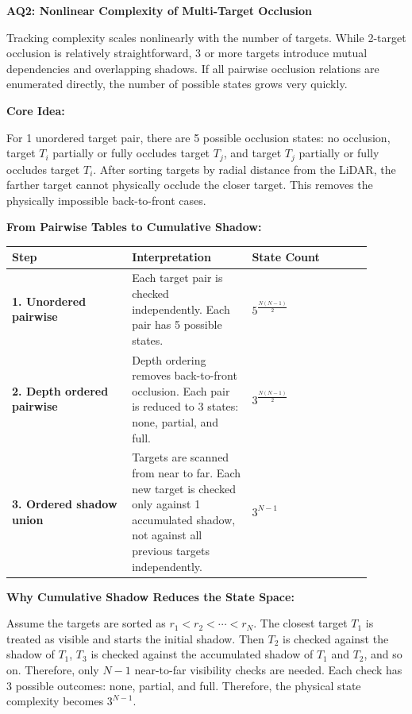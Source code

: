 \documentclass[11pt,a4paper]{report}
\newcommand{\boxitemtitle}[1]{
    \vspace{0.5em}
    {\large\textbf{\color{DeepBlue} #1}}\par
    \vspace{0.8em}
}
\begin{document}
\newpage
\boxitemtitle{AQ2: Nonlinear Complexity of Multi-Target Occlusion}
\begin{contentbox}
Tracking complexity scales nonlinearly with the number of targets. While 2-target occlusion is relatively straightforward, 3 or more targets introduce mutual dependencies and overlapping shadows. If all pairwise occlusion relations are enumerated directly, the number of possible states grows very quickly.

\vspace{0.6em}
\textbf{Core Idea:}

For 1 unordered target pair, there are 5 possible occlusion states: no occlusion, target $T_i$ partially or fully occludes target $T_j$, and target $T_j$ partially or fully occludes target $T_i$. After sorting targets by radial distance from the LiDAR, the farther target cannot physically occlude the closer target. This removes the physically impossible back-to-front cases.

\vspace{0.8em}
\textbf{From Pairwise Tables to Cumulative Shadow:}

\begin{center}
\small
\begin{tabular}{p{0.30\linewidth} p{0.30\linewidth} p{0.30\linewidth}}
\hline
\textbf{Step} & \textbf{Interpretation} & \textbf{State Count} \\
\hline
\textbf{1. Unordered pairwise} &
Each target pair is checked independently. Each pair has 5 possible states. &
$5^{\frac{N(N-1)}{2}}$
\\
\textbf{2. Depth ordered pairwise} &
Depth ordering removes back-to-front occlusion. Each pair is reduced to 3 states: none, partial, and full. &
$3^{\frac{N(N-1)}{2}}$
\\
\textbf{3. Ordered shadow union} &
Targets are scanned from near to far. Each new target is checked only against 1 accumulated shadow, not against all previous targets independently. &
$3^{N-1}$
\\
\hline
\end{tabular}
\end{center}

\vspace{0.9em}
\textbf{Why Cumulative Shadow Reduces the State Space:}

Assume the targets are sorted as $r_1 < r_2 < \cdots < r_N$. The closest target $T_1$ is treated as visible and starts the initial shadow. Then $T_2$ is checked against the shadow of $T_1$, $T_3$ is checked against the accumulated shadow of $T_1$ and $T_2$, and so on. Therefore, only $N-1$ near-to-far visibility checks are needed. Each check has 3 possible outcomes: none, partial, and full. Therefore, the physical state complexity becomes $3^{N-1}$.
\end{contentbox}
\end{document}
